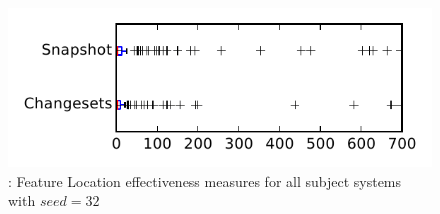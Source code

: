 
\begin{figure}
\centering
\includegraphics[height=0.4\textheight]{figures/flt_seed/rq1_tiny_32}
\caption{\rone: Feature Location effectiveness measures for all subject systems with $seed=32$}
\label{fig:flt_seed:rq1:tiny}
\end{figure}
